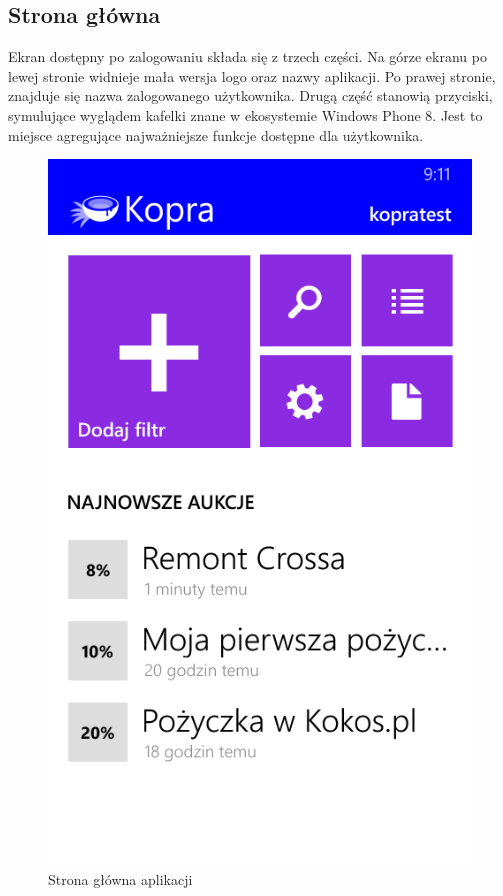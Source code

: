 \documentclass[a4paper,twoside,titlepage,openright]{book}
\begin{document}
\subsection{Strona główna}
Ekran dostępny po zalogowaniu składa się z trzech części. Na górze ekranu po lewej stronie widnieje mała wersja logo oraz nazwy aplikacji. Po prawej stronie, znajduje się nazwa zalogowanego użytkownika. Drugą część stanowią przyciski, symulujące wyglądem kafelki znane w ekosystemie Windows Phone 8. Jest to miejsce agregujące najważniejsze funkcje dostępne dla użytkownika. 
\begin{figure}[htp]
	\centering
	\begin{minipage}[b]{0.3\textwidth}
		\includegraphics[width=\textwidth]{mainScreen.png}
		\caption{Strona główna aplikacji}
	\end{minipage}
\hspace*{60px}
	\hfill
\end{figure}
\end{document}
